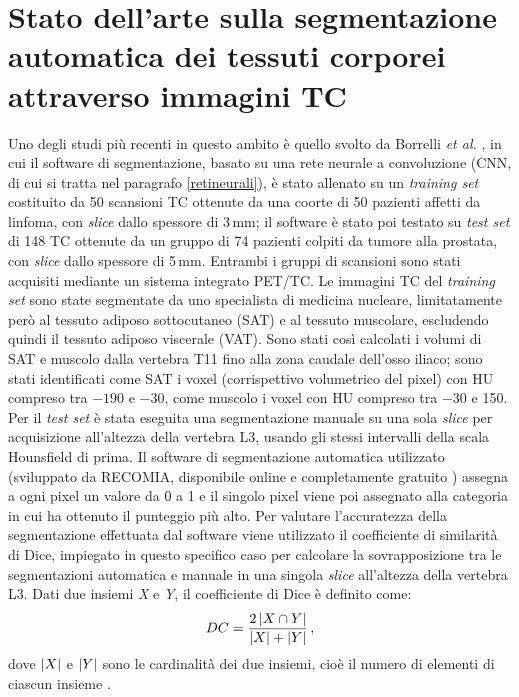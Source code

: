 \section{Stato dell'arte sulla segmentazione automatica dei tessuti corporei attraverso immagini TC}
Uno degli studi più recenti in questo ambito è quello svolto da Borrelli \textit{et al.} \cite{Borrelli2021}, in cui il software di segmentazione, basato su una rete neurale a convoluzione (CNN, di cui si tratta nel paragrafo \ref{retineurali}), è stato allenato su un \textit{training set} costituito da 50 scansioni TC ottenute da una coorte di 50 pazienti affetti da linfoma, con \textit{slice} dallo spessore di 3\,mm; il software è stato poi testato su \textit{test set} di 148 TC ottenute da un gruppo di 74 pazienti colpiti da tumore alla prostata, con \textit{slice} dallo spessore di 5\,mm. Entrambi i gruppi di scansioni sono stati acquisiti mediante un sistema integrato PET/TC. Le immagini TC del \textit{training set} sono state segmentate da uno specialista di medicina nucleare, limitatamente però al tessuto adiposo sottocutaneo (SAT) e al tessuto muscolare, escludendo quindi il tessuto adiposo viscerale (VAT). Sono stati così calcolati i volumi di SAT e muscolo dalla vertebra T11 fino alla zona caudale dell'osso iliaco; sono stati identificati come SAT i voxel (corrispettivo volumetrico del pixel) con HU compreso tra $-190$ e $-30$, come muscolo i voxel con HU compreso tra $-30$ e 150. Per il \textit{test set} è stata eseguita una segmentazione manuale su una sola \textit{slice} per acquisizione all'altezza della vertebra L3, usando gli stessi intervalli della scala Hounsfield di prima. Il software di segmentazione automatica utilizzato (sviluppato da RECOMIA, disponibile online e completamente gratuito \cite{recomia}) assegna a ogni pixel un valore da 0 a 1 e il singolo pixel viene poi assegnato alla categoria in cui ha ottenuto il punteggio più alto. Per valutare l’accuratezza della segmentazione effettuata dal software viene utilizzato il coefficiente di similarità di Dice, impiegato in questo specifico caso per calcolare la sovrapposizione tra le segmentazioni automatica e manuale in una singola \textit{slice} all'altezza della vertebra L3.
Dati due insiemi \textit{X} e \textit{Y}, il coefficiente di Dice è definito come:
\begin{equation}
    DC = \dfrac{2\,\abs{X \cap Y}}{\abs{X}+\abs{Y}}\,,
\end{equation}
dove $\abs{X}$ e $\abs{Y}$ sono le cardinalità dei due insiemi, cioè il numero di elementi di ciascun insieme \cite{dice}.

